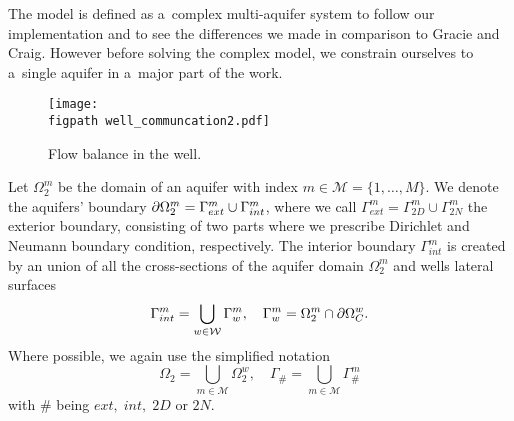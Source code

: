 The model is defined as a~complex multi-aquifer system to follow our implementation and to see the differences
we made in comparison to Gracie and Craig. However before solving the complex model,
we constrain ourselves to a~single aquifer in a~major part of the work.
%
\begin{figure}[!htb]
%     
  \begin{center}         
    \texttt{[image: \\figpath well\_communcation2.pdf]}
  \end{center}
  \caption{Flow balance in the well.}
  \label{fig:well_flows}
\end{figure}

Let $\Omega^m_2$ be the domain of an aquifer with index $m\in\mathcal{M}=\{1,\ldots,M\}$.
We denote the aquifers' boundary $\partial\Omega^m_2 = \Gamma^m_{ext} \cup \Gamma^m_{int}$,
where we call $\Gamma^m_{ext} = \Gamma^m_{2D} \cup \Gamma^m_{2N}$ the exterior boundary, consisting of two parts where we prescribe
Dirichlet and Neumann boundary condition, respectively.
The interior boundary $\Gamma^m_{int}$ is created by an union of all the cross-sections of the aquifer domain $\Omega^m_2$
and wells lateral surfaces
\begin{equation}
    \Gamma^m_{int} = \bigcup_{\substack{w\in\mathcal{W}}} \Gamma^m_w, \quad \Gamma^m_w = \Omega^m_2 \cap \partial\Omega^w_C.
\end{equation}
Where possible, we again use the simplified notation
\begin{equation}
    \Omega_2 = \bigcup_{m\in\mathcal{M}} \Omega^w_2, \quad \Gamma_{\#} = \bigcup_{m\in\mathcal{M}} \Gamma^m_{\#}
\end{equation}
with $\#$ being $ext,\; int,\; 2D$ or $2N$.


